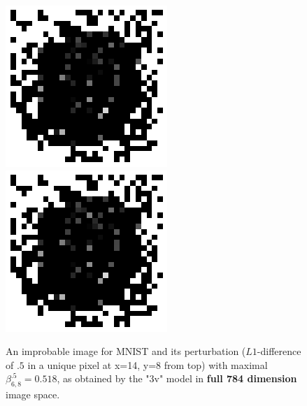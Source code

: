 \begin{figure}[t!]
	\centering
\includegraphics[scale=0.6]{image.png} \hspace{1.5cm}
\includegraphics[scale=0.6]{perturb.png}
\caption{An improbable image for MNIST and its perturbation ($L1$-difference of $.5$ in a unique pixel at x=14, y=8 from top) with maximal $\beta^{.5}_{6,8}=0.518$, as obtained by the "3v" model in {\bf full 784 dimension} image space.}
\label{fig3}
\end{figure}	

